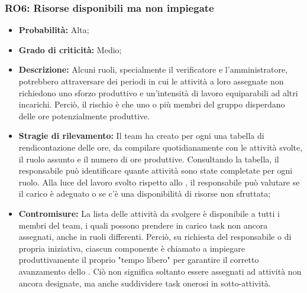 \subsubsection{RO6: Risorse disponibili ma non impiegate}
\begin{itemize}
    \item \textbf{Probabilità:} Alta;
    \item \textbf{Grado di criticità:} Medio;
    \item \textbf{Descrizione:} Alcuni ruoli, specialmente il verificatore e l'amministratore, potrebbero attraversare dei periodi in cui le attività a loro assegnate non richiedono uno sforzo produttivo e un'intensità di lavoro equiparabili ad altri incarichi. Perciò, il rischio è che uno o più membri del gruppo disperdano delle ore potenzialmente produttive.
    \item \textbf{Stragie di rilevamento:} Il team ha creato per ogni  una tabella di rendicontazione delle ore, da compilare quotidianamente con le attività svolte, il ruolo assunto e il numero di ore produttive. Consultando la tabella, il responsabile può identificare quante attività sono state completate per ogni ruolo. Alla luce del lavoro svolto rispetto allo , il responsabile può valutare se il carico è adeguato o se c'è una disponibilità di risorse non sfruttata;
    \item \textbf{Contromisure:} La lista delle attività da svolgere è disponibile a tutti i membri del team, i quali possono prendere in carico task non ancora assegnati, anche in ruoli differenti. Perciò, su richiesta del responsabile o di propria iniziativa, ciascun componente è chiamato a impiegare produttivamente il proprio "tempo libero" per garantire il corretto avanzamento dello . Ciò non significa soltanto essere assegnati ad attività non ancora designate, ma anche suddividere task onerosi in sotto-attività. 
\end{itemize}
